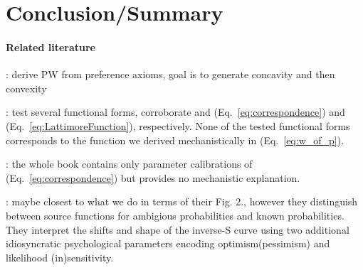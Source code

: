 \documentclass[a4paper, 12pt]{article}
\newcommand{\eref}[1]{(Eq.~\ref{eq:#1})}
\newcommand{\MK}[1]{{\it ***MK: #1 MK***}}
\newcommand{\OP}[1]{{\it ***OP: #1 OP***}}
\begin{document}
\FloatBarrier

\section{Conclusion/Summary}

\paragraph{Related literature}

\cite{WuGonzalez1996,Prelec1998}: derive PW from preference axioms, goal is to generate concavity and then convexity

\cite{Stott2006}: test several functional forms, corroborate \cite{Prelec1998} and \eref{correspondence} and \eref{LattimoreFunction}, respectively. None of the tested functional forms corresponds to the function we derived mechanistically in \eref{w_of_p}. 

\cite{Wakker2010}: the whole book contains only parameter calibrations of \eref{correspondence} but provides no mechanistic explanation.

\cite{AbdellaouiETAL2011}: maybe closest to what we do in terms of their Fig. 2., however they distinguish between source functions for ambigious probabilities and known probabilities. They interpret the shifts and shape of the inverse-S curve using two additional idiosyncratic psychological parameters encoding optimism(pessimism) and likelihood (in)sensitivity. 

\end{document}

